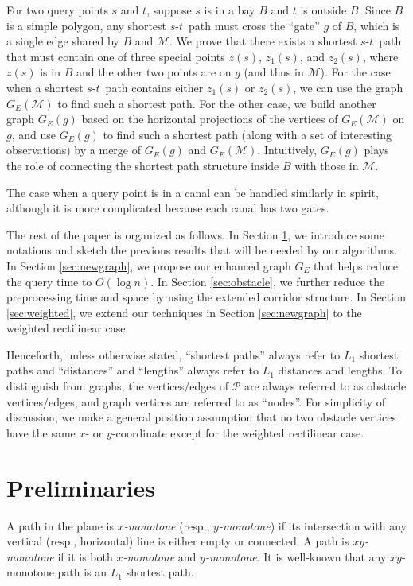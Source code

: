 \documentclass[english,runningheads,11pt]{llncs}
\def\calP{\mathcal{P}}
\def\calM{\mathcal{M}}
\def\st{$s$-$t$}
\begin{document}
For two query points $s$ and $t$, suppose $s$ is in a bay $B$ and $t$ is outside $B$.
Since $B$ is a simple polygon, any shortest \st\ path must cross the ``gate'' $g$ of $B$,
which is a single edge shared by $B$ and $\calM$. We prove that there exists a shortest
\st\ path that must contain one of three special points $z(s)$,
$z_1(s)$, and $z_2(s)$, where $z(s)$ is in $B$ and the other
two points are on $g$ (and thus in $\calM$). For the case
when a shortest \st\ path contains either $z_1(s)$ or $z_2(s)$,
we can use the graph $G_E(\calM)$ to find such a shortest
path. For the other case, we build another graph $G_E(g)$ based on the
horizontal projections of the vertices of $G_E(\calM)$ on $g$, and use $G_E(g)$ to find
such a shortest path (along with a set of interesting observations) by a merge of
$G_E(g)$ and $G_E(\calM)$. Intuitively, $G_E(g)$ plays the role of connecting the shortest
path structure inside $B$ with those in $\calM$.

The case when a query point is in a canal can be handled similarly in spirit,
although it is more complicated because each canal has two gates.



The rest of the paper is organized as follows. In Section
\ref{sec:pre}, we introduce some notations and sketch the previous results
that will be needed by our algorithms. In Section
\ref{sec:newgraph}, we
propose our enhanced graph $G_E$ that helps reduce the query time to $O(\log n)$. In
Section \ref{sec:obstacle}, we further reduce
the preprocessing time and space by using the extended corridor
structure. In Section \ref{sec:weighted}, we
extend our techniques in Section \ref{sec:newgraph} to the weighted
rectilinear case.


Henceforth, unless otherwise stated, ``shortest paths'' always refer
to $L_1$ shortest paths and ``distances'' and ``lengths'' always refer to $L_1$
distances and lengths. To distinguish from graphs, the vertices/edges of
$\calP$ are always referred to as obstacle vertices/edges,
and graph vertices are referred to as ``nodes''. For
simplicity of discussion, we make a general position assumption that
no two obstacle vertices have the same $x$- or
$y$-coordinate except for the weighted rectilinear case.


\section{Preliminaries}
\label{sec:pre}

A path in the plane is {\em $x$-monotone} (resp., {\em $y$-monotone})
if its intersection with any
vertical (resp., horizontal) line is either empty or connected. A
path is {\em $xy$-monotone} if it is both {\em $x$-monotone} and {\em
$y$-monotone}. It is well-known that any $xy$-monotone path is an
$L_1$ shortest path.
\end{document}
